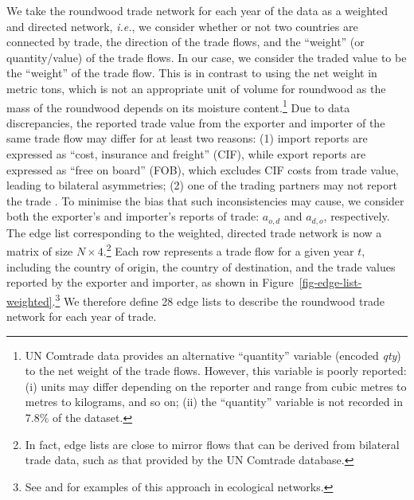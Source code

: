 \documentclass[
  authoryear,
  review,
  3p]{elsarticle}
\begin{document}
We take the roundwood trade network for each year of the data as a
weighted and directed network, \emph{i.e.}, we consider whether or not
two countries are connected by trade, the direction of the trade flows,
and the ``weight'' (or quantity/value) of the trade flows. In our case,
we consider the traded value to be the ``weight'' of the trade flow.
This is in contrast to using the net weight in metric tons, which is not
an appropriate unit of volume for roundwood as the mass of the roundwood
depends on its moisture content.\footnote{UN Comtrade data provides an
  alternative ``quantity'' variable (encoded \emph{qty}) to the net
  weight of the trade flows. However, this variable is poorly reported:
  (i) units may differ depending on the reporter and range from cubic
  metres to metres to kilograms, and so on; (ii) the ``quantity''
  variable is not recorded in 7.8\% of the dataset.} Due to data
discrepancies, the reported trade value from the exporter and importer
of the same trade flow may differ for at least two reasons: (1) import
reports are expressed as ``cost, insurance and freight'' (CIF), while
export reports are expressed as ``free on board'' (FOB), which excludes
CIF costs from trade value, leading to bilateral asymmetries; (2) one of
the trading partners may not report the trade
\citep{gaulier_baci_2010, rougieux_forest_2017, kallio_reliability_2018, chen_advancing_2022, mitikj_bridging_2024}.
To minimise the bias that such inconsistencies may cause, we consider
both the exporter's and importer's reports of trade: \(a_{o,d}\) and
\(a_{d,o}\), respectively. The edge list corresponding to the weighted,
directed trade network is now a matrix of size
\(N \times 4\).\footnote{In fact, edge lists are close to mirror flows
  that can be derived from bilateral trade data, such as that provided
  by the UN Comtrade database.} Each row represents a trade flow for a
given year \(t\), including the country of origin, the country of
destination, and the trade values reported by the exporter and importer,
as shown in Figure~\ref{fig-edge-list-weighted}.\footnote{See
  \citet{rayfield_connectivity_2011} and \citet{thompson_loss_2017} for
  examples of this approach in ecological networks.} We therefore define
28 edge lists to describe the roundwood trade network for each year of
trade.
\end{document}
